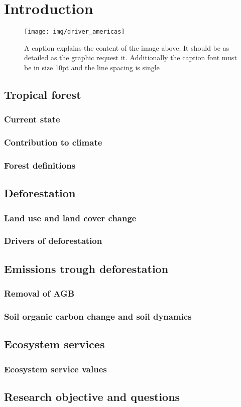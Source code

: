 \section{Introduction}
\label{sec:introduction}

\begin{figure}
	\centering
	\texttt{[image: img/driver\_americas]}
	\caption[list titel]{A caption explains the content of the image above. It should be as detailed as the graphic request it. Additionally the caption font must be in size 10pt and the line spacing is single}
	\label{fig:test}
\end{figure}

\lipsum[1-8]

\subsection{Tropical forest}
\subsubsection{Current state}
\subsubsection{Contribution to climate}
\subsubsection{Forest definitions}
\subsection{Deforestation}
\subsubsection{Land use and land cover change}
\subsubsection{Drivers of deforestation}
\subsection{Emissions trough deforestation}
\subsubsection{Removal of AGB}
\subsubsection{Soil organic carbon change and soil dynamics}
\subsection{Ecosystem services}
\subsubsection{Ecosystem service values}
\subsection{Research objective and questions}
